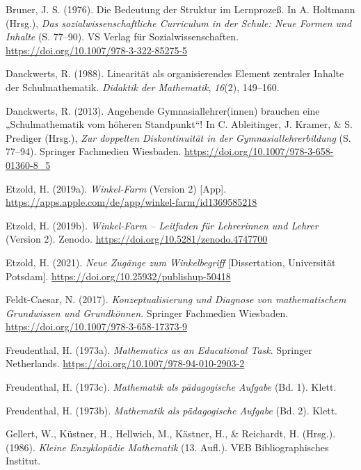 \documentclass[
]{scrbook}
\newlength{\cslhangindent}
\newenvironment{CSLReferences}[2] %
 {\begin{list}{}{%
  \setlength{\itemindent}{0pt}
  \setlength{\leftmargin}{0pt}
  \setlength{\parsep}{0pt}
  \ifodd #1
   \setlength{\leftmargin}{\cslhangindent}
   \setlength{\itemindent}{-1\cslhangindent}
  \fi
  \setlength{\itemsep}{#2\baselineskip}}}
 {\end{list}}
\theoremstyle{definition}
\theoremstyle{definition}
\theoremstyle{definition}
\theoremstyle{definition}
\theoremstyle{remark}
\begin{document}
\begin{CSLReferences}{1}{0}
Bruner, J. S. (1976). Die {Bedeutung} der {Struktur} im {Lernprozeß}. In A. Holtmann (Hrsg.), \emph{Das sozialwissenschaftliche {Curriculum} in der {Schule}: {Neue} {Formen} und {Inhalte}} (S. 77--90). VS Verlag für Sozialwissenschaften. \url{https://doi.org/10.1007/978-3-322-85275-5}

Danckwerts, R. (1988). Linearität als organisierendes Element zentraler Inhalte der Schulmathematik. \emph{Didaktik der Mathematik}, \emph{16}(2), 149--160.

Danckwerts, R. (2013). Angehende {Gymnasiallehrer}(innen) brauchen eine „{Schulmathematik} vom höheren {Standpunkt}``! In C. Ableitinger, J. Kramer, \& S. Prediger (Hrsg.), \emph{Zur doppelten {Diskontinuität} in der {Gymnasiallehrerbildung}} (S. 77--94). Springer Fachmedien Wiesbaden. \url{https://doi.org/10.1007/978-3-658-01360-8_5}

Etzold, H. (2019a). \emph{Winkel-{Farm}} (Version 2) {[}App{]}. \url{https://apps.apple.com/de/app/winkel-farm/id1369585218}

Etzold, H. (2019b). \emph{Winkel-{Farm} -- {Leitfaden} für {Lehrerinnen} und {Lehrer}} (Version 2). Zenodo. \url{https://doi.org/10.5281/zenodo.4747700}

Etzold, H. (2021). \emph{Neue Zugänge zum Winkelbegriff} {[}Dissertation, Universität Potsdam{]}. \url{https://doi.org/10.25932/publishup-50418}

Feldt-Caesar, N. (2017). \emph{Konzeptualisierung und {Diagnose} von mathematischem {Grundwissen} und {Grundkönnen}}. Springer Fachmedien Wiesbaden. \url{https://doi.org/10.1007/978-3-658-17373-9}

Freudenthal, H. (1973a). \emph{Mathematics as an {Educational} {Task}}. Springer Netherlands. \url{https://doi.org/10.1007/978-94-010-2903-2}

Freudenthal, H. (1973c). \emph{Mathematik als pädagogische {Aufgabe}} (Bd. 1). Klett.

Freudenthal, H. (1973b). \emph{Mathematik als pädagogische {Aufgabe}} (Bd. 2). Klett.

Gellert, W., Küstner, H., Hellwich, M., Kästner, H., \& Reichardt, H. (Hrsg.). (1986). \emph{Kleine {Enzyklopädie} {Mathematik}} (13. Aufl.). VEB Bibliographisches Institut.


\end{CSLReferences}
\end{document}
